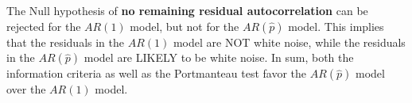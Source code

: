 
The Null hypothesis of \textbf{no remaining residual autocorrelation} can be rejected for the \(AR(1)\) model,
  but not for the \(AR(\hat{p})\) model.
This implies that the residuals in the \(AR(1)\) model are NOT white noise,
  while the residuals in the \(AR(\hat{p})\) model are LIKELY to be white noise.
In sum, both the information criteria as well as the Portmanteau test favor the \(AR(\hat{p})\) model over the \(AR(1)\) model.